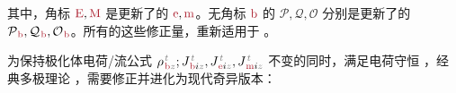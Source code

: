 其中，角标 $\textcolor{Maroon}{\text{E}},\textcolor{Maroon}{\text{M}}$ 是更新了的 $\textcolor{Maroon}{\text{e}},\textcolor{Maroon}{\text{m}}$。无角标 $\textcolor{Maroon}{\text{b}}$ 的 $\mathcal{P},\mathcal{Q},\mathcal{O}$ 分别是更新了的 $\mathcal{P}_{\;\!\textcolor{Maroon}{\text{b}}},\mathcal{Q}_{\;\!\textcolor{Maroon}{\text{b}}},\mathcal{O}_{\;\!\textcolor{Maroon}{\text{b}}}$。所有的这些修正量，重新适用于 。

为保持极化体电荷/流公式 ${\rho}^{\;\!\mathcolor{gray}{t}}_{\;\!\textcolor{Maroon}{\text{b}} \mathcolor{gray}{z}};{J}^{\;\!\mathcolor{gray}{t}}_{\;\!\textcolor{Maroon}{\text{b}} i \mathcolor{gray}{z}},{J}^{\;\!\mathcolor{gray}{t}}_{\;\!\textcolor{Maroon}{\text{e}} i \mathcolor{gray}{z}},{J}^{\;\!\mathcolor{gray}{t}}_{\;\!\textcolor{Maroon}{\text{m}} i \mathcolor{gray}{z}}$ 不变的同时，满足电荷守恒 ，经典多极理论 ，需要修正并进化为现代奇异版本：
